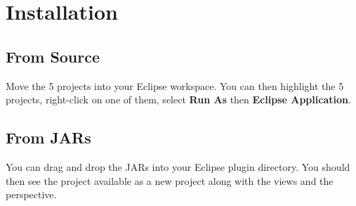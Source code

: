 \pagebreak
\section{Installation}
\subsection{From Source}
Move the 5 projects into your Eclipse workspace. You can then highlight the 5 projects, right-click on
one of them, select \textbf{Run As} then \textbf{Eclipse Application}. 
\subsection{From JARs}
You can drag and drop the JARs into your Eclipse plugin directory. 
You should then see the project available as a new project along with the views and the perspective.
